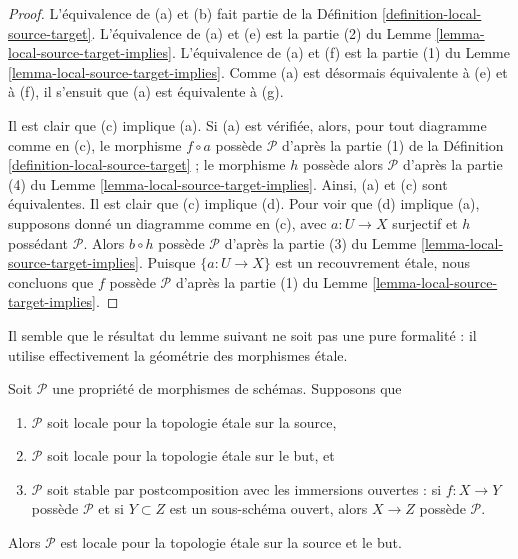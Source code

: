 \begin{proof}
L'équivalence de (a) et (b) fait partie de la
Définition \ref{definition-local-source-target}.
L'équivalence de (a) et (e) est la partie (2) du
Lemme \ref{lemma-local-source-target-implies}.
L'équivalence de (a) et (f) est la partie (1) du
Lemme \ref{lemma-local-source-target-implies}.
Comme (a) est désormais équivalente à (e) et à (f), il s'ensuit que (a) est
équivalente à (g).

\medskip\noindent
Il est clair que (c) implique (a). Si (a) est vérifiée, alors, pour tout
diagramme comme en (c), le morphisme $f \circ a$ possède $\mathcal{P}$ d'après
la partie (1) de la Définition \ref{definition-local-source-target} ; le
morphisme $h$ possède alors $\mathcal{P}$ d'après la partie (4) du
Lemme \ref{lemma-local-source-target-implies}.
Ainsi, (a) et (c) sont équivalentes. Il est clair que (c) implique (d).
Pour voir que (d) implique (a), supposons donné un diagramme comme en (c),
avec $a : U \to X$ surjectif et $h$ possédant $\mathcal{P}$.
Alors $b \circ h$ possède $\mathcal{P}$ d'après la partie (3) du
Lemme \ref{lemma-local-source-target-implies}.
Puisque $\{a : U \to X\}$ est un recouvrement \'etale, nous concluons que
$f$ possède $\mathcal{P}$ d'après la partie (1) du
Lemme \ref{lemma-local-source-target-implies}.
\end{proof}

\noindent
Il semble que le résultat du lemme suivant ne soit pas une pure formalité :
il utilise effectivement la géométrie des morphismes \'etale.

\begin{lemma}
\label{lemma-etale-local-source-target}
Soit $\mathcal{P}$ une propriété de morphismes de schémas. Supposons que
\begin{enumerate}
\item $\mathcal{P}$ soit locale pour la topologie \'etale sur la source,
\item $\mathcal{P}$ soit locale pour la topologie \'etale sur le but, et
\item $\mathcal{P}$ soit stable par postcomposition avec les immersions
ouvertes : si $f : X \to Y$ possède $\mathcal{P}$ et si $Y \subset Z$ est un
sous-schéma ouvert, alors $X \to Z$ possède $\mathcal{P}$.
\end{enumerate}
Alors $\mathcal{P}$ est locale pour la topologie \'etale sur la source et le
but.
\end{lemma}

